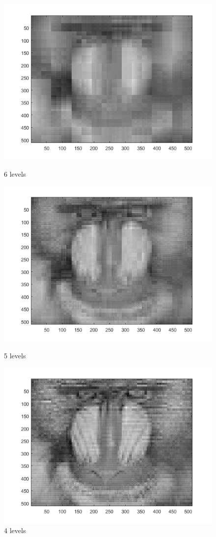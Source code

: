 \documentclass[english]{article}
\begin{document}
\begin{figure}[!htb]
  \includegraphics[width=\linewidth]{mandrill/mandrill_approx.png}
  \caption{6 levels}\label{fig:awesome_image1}
\endminipage\hfill
{}
  \includegraphics[width=\linewidth]{mandrill/mandrill_approx_2.png}
  \caption{5 levels}\label{fig:awesome_image2}
\endminipage\hfill
{}%
  \includegraphics[width=\linewidth]{mandrill/mandrill_approx_3.png}
  \caption{4 levels}\label{fig:awesome_image3}
\endminipage
\end{figure}
\end{document}

